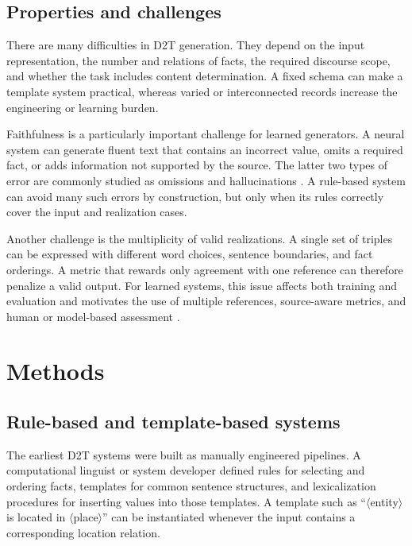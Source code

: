 \subsection{Properties and challenges}

There are many difficulties in D2T generation.
They depend on the input representation, the
number and relations of facts, the required discourse scope, and whether the
task includes content determination. A fixed schema can make a template system
practical, whereas varied or interconnected records increase the engineering or
learning burden.

Faithfulness is a particularly important challenge for learned generators. A
neural system can generate fluent text that contains an incorrect value, omits
a required fact, or adds information not supported by the source. The latter
two types of error are commonly studied as omissions and hallucinations
\cite{wiseman-etal-2017-challenges,dusek-kasner-2020-evaluating}. A rule-based
system can avoid many such errors by construction, but only when its rules
correctly cover the input and realization cases.

Another challenge is the multiplicity of valid realizations. A single set of
triples can be expressed with different word choices, sentence boundaries, and
fact orderings. A metric that rewards only agreement with one reference can
therefore penalize a valid output. For learned systems, this issue affects both
training and evaluation and motivates the use of multiple references,
source-aware metrics, and human or model-based assessment
\cite{dhingra-etal-2019-handling,novikova-etal-2017-need}.

\section{Methods}
\label{sec:d2t-methods}

\subsection{Rule-based and template-based systems}

The earliest D2T systems were built as manually engineered pipelines. A
computational linguist or system developer defined rules for selecting and
ordering facts, templates for common
sentence structures, and lexicalization procedures for inserting values into
those templates. A template such as ``$\langle$entity$\rangle$ is located in
$\langle$place$\rangle$'' can be instantiated whenever the input contains a
corresponding location relation.

